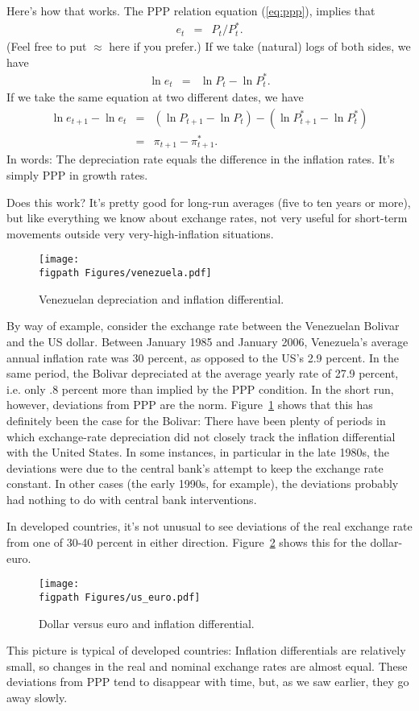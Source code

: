 Here's how that works.
The PPP relation  equation (\ref{eq:ppp}), implies that
\begin{eqnarray*}
    e_t &=& P_t/P_t^* .
\end{eqnarray*}
(Feel free to put $\approx$ here if you prefer.)
If we take (natural) logs of both sides, we have
\begin{eqnarray*}
    \ln e_t &=& \ln P_t - \ln P_t^* .
\end{eqnarray*}
If we take the same equation at two different dates,
we have
\begin{eqnarray*}
    \ln e_{t+1}-\ln e_{t} &=&
        (\ln P_{t+1}-\ln P_{t}) - (\ln P^{*}_{t+1}-\ln P^{*}_{t}) \\
                &=& \pi_{t+1} - \pi^*_{t+1} .
\end{eqnarray*}
In words:  The depreciation rate equals the difference in the inflation rates.
It's simply PPP in growth rates.


Does this work?
It's pretty good for long-run averages (five to ten years or more),
but like everything we know about exchange rates,
not very useful for short-term movements outside very
very-high-inflation situations.

\begin{figure}[ht]
    \caption{Venezuelan depreciation and inflation differential.}
    \label{fig:venezuela}
    \centering
    \texttt{[image: \\figpath Figures/venezuela.pdf]}
\end{figure}

By way of example, consider the exchange rate between the Venezuelan
Bolivar and the US dollar. Between January 1985 and January 2006,
Venezuela's average annual inflation rate was 30 percent, as opposed to
the US's 2.9 percent. In the same period, the Bolivar
depreciated at the average yearly rate of 27.9 percent, i.e. only .8 percent
more than implied by the PPP condition. In the short run, however,
deviations from PPP are the norm.
Figure~\ref{fig:venezuela} shows that this has definitely been the
case for the Bolivar: There have been plenty of periods in which
exchange-rate depreciation did not closely track the inflation
differential with the United States. In some instances, in
particular in the late 1980s, the deviations were due to the central
bank's attempt to keep the exchange rate constant.
In other cases (the early 1990s, for example), the deviations
probably had nothing to do with central bank  interventions.

%
In developed countries, it's not unusual to see deviations of
the real exchange rate from one of 30-40 percent in either direction.
Figure~\ref{fig:us_euro} shows this for the dollar-euro.
\begin{figure}[ht]
    \caption{Dollar versus euro and inflation differential.}
    \label{fig:us_euro}
    \centering
    \texttt{[image: \\figpath Figures/us\_euro.pdf]}
\end{figure}
%
This picture is typical of developed countries: Inflation differentials are relatively small,
so changes in the real and nominal exchange rates are almost equal.
These deviations from PPP tend to disappear with time,
but, as we saw earlier, they go away slowly.


